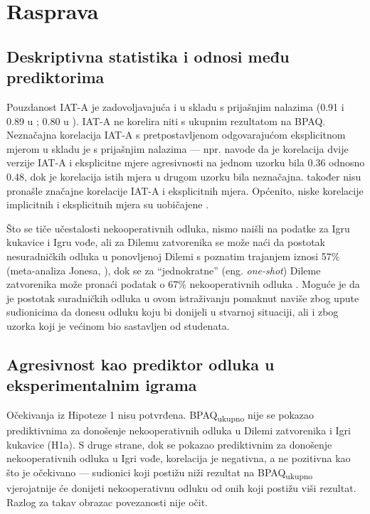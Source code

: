 \documentclass[a4paper, 12pt]{report}
\begin{document}
\section{Rasprava}

\subsection{Deskriptivna statistika i odnosi među prediktorima}

Pouzdanost IAT-A je zadovoljavajuća i u skladu s prijašnjim nalazima 
(0.91 i 0.89 u \citealp{richetin2010predictive}; 0.80 u
\citealp{banse2015predicting}).
IAT-A ne korelira niti s ukupnim rezultatom na BPAQ. 
Neznačajna korelacija IAT-A s pretpostavljenom odgovarajućom eksplicitnom mjerom
u skladu je s prijašnjim nalazima --- npr. \citet{banse2015predicting}
navode da je korelacija dvije verzije IAT-A i eksplicitne mjere agresivnosti na
jednom uzorku bila 0.36 odnosno 0.48, dok je korelacija istih mjera u drugom
uzorku bila neznačajna. \citet{richetin2010predictive} također nisu
pronašle značajne korelacije IAT-A i eksplicitnih mjera.
Općenito, niske korelacije  implicitnih i eksplicitnih mjera su uobičajene
\citep{uhlmann2012getting, mcclelland1989self}.

Što se tiče učestalosti nekooperativnih odluka, nismo naišli na podatke za
Igru kukavice i Igru vođe, ali za Dilemu zatvorenika se može naći 
da postotak nesuradničkih odluka u ponovljenoj Dilemi s poznatim
trajanjem iznosi 57\% (meta-analiza Jonesa, \citeyear{jones2008smarter}), dok se za
\enquote{jednokratne}
(eng. \emph{one-shot}) Dileme zatvorenika može pronaći podatak o 67\%
nekooperativnih odluka \citep{shafir1992thinking}. Moguće je da je postotak
suradničkih odluka u ovom istraživanju pomaknut naviše zbog upute sudionicima da
donesu odluku koju bi donijeli u stvarnoj situaciji, ali i zbog uzorka koji je
većinom bio sastavljen od studenata.

\subsection{Agresivnost kao prediktor odluka u eksperimentalnim igrama}

Očekivanja iz Hipoteze 1 nisu potvrđena. BPAQ\textsubscript{ukupno} 
nije se pokazao prediktivnima za donošenje nekooperativnih odluka u Dilemi
zatvorenika i Igri kukavice (H1a). S druge strane, dok se pokazao
prediktivnim za donošenje nekooperativnih odluka u Igri vođe, korelacija je
negativna, a ne pozitivna kao što je očekivano --- sudionici koji postižu niži
rezultat na BPAQ\textsubscript{ukupno} vjerojatnije će donijeti
nekooperativnu odluku od onih koji postižu viši rezultat.
Razlog za takav obrazac povezanosti nije očit. 
\end{document}
